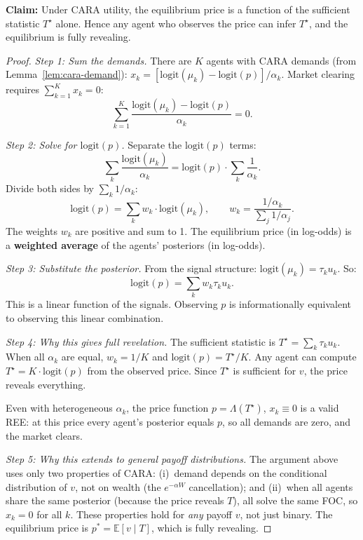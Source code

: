 \documentclass[12pt,letterpaper]{article}
\theoremstyle{definition}
\theoremstyle{remark}
\newcommand{\E}{\mathbb{E}}
\newcommand{\Lam}{\Lambda}            %
\newcommand{\logit}{\mathrm{logit}}
\newcommand{\Tstar}{T^{\!\star}}
\newcommand{\1}{\mathbf{1}}
\begin{document}
\textbf{Claim:} Under CARA utility, the equilibrium price is a function
of the sufficient statistic $\Tstar$ alone. Hence any agent who observes
the price can infer $\Tstar$, and the equilibrium is fully revealing.

\begin{proof}
\emph{Step 1: Sum the demands.}
There are $K$ agents with CARA demands (from Lemma~\ref{lem:cara-demand}):
$x_k = [\logit(\mu_k) - \logit(p)]/\alpha_k$.
Market clearing requires $\sum_{k=1}^K x_k = 0$:
\[
   \sum_{k=1}^K \frac{\logit(\mu_k) - \logit(p)}{\alpha_k} = 0.
\]

\emph{Step 2: Solve for $\logit(p)$.}
Separate the $\logit(p)$ terms:
\[
   \sum_k \frac{\logit(\mu_k)}{\alpha_k}
   = \logit(p) \cdot \sum_k \frac{1}{\alpha_k}.
\]
Divide both sides by $\sum_k 1/\alpha_k$:
\[
   \logit(p) = \sum_k w_k \cdot \logit(\mu_k),
   \qquad w_k = \frac{1/\alpha_k}{\sum_j 1/\alpha_j}.
\]
The weights $w_k$ are positive and sum to 1. The equilibrium price (in
log-odds) is a \textbf{weighted average} of the agents' posteriors (in
log-odds).

\emph{Step 3: Substitute the posterior.}
From the signal structure: $\logit(\mu_k) = \tau_k u_k$. So:
\[
   \logit(p) = \sum_k w_k \tau_k u_k.
\]
This is a linear function of the signals. Observing $p$ is
informationally equivalent to observing this linear combination.

\emph{Step 4: Why this gives full revelation.}
The sufficient statistic is $\Tstar = \sum_k \tau_k u_k$. When all
$\alpha_k$ are equal, $w_k = 1/K$ and $\logit(p) = \Tstar/K$. Any agent
can compute $\Tstar = K \cdot \logit(p)$ from the observed price.
Since $\Tstar$ is sufficient for $v$, the price reveals everything.

Even with heterogeneous $\alpha_k$, the price function
$p = \Lam(\Tstar)$, $x_k \equiv 0$ is a valid REE: at this price every
agent's posterior equals $p$, so all demands are zero, and the market
clears.

\emph{Step 5: Why this extends to general payoff distributions.}
The argument above uses only two properties of CARA:
(i)~demand depends on the conditional distribution of $v$, not on
wealth (the $e^{-\alpha W}$ cancellation); and
(ii)~when all agents share the same posterior (because the price reveals
$T$), all solve the same FOC, so $x_k = 0$ for all $k$.
These properties hold for \emph{any} payoff $v$, not just binary.
The equilibrium price is $p^* = \E[v \mid T]$, which is fully revealing.
\end{proof}
\end{document}
